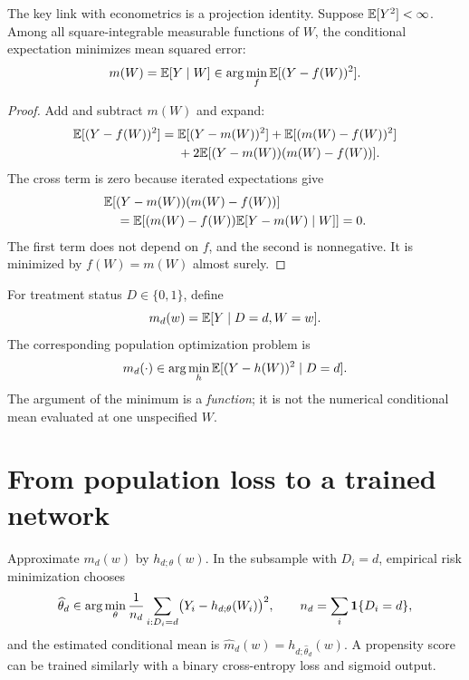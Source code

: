 The key link with econometrics is a projection identity.  Suppose
$\mathbb{E}[Y^2]<\infty$.  Among all square-integrable measurable functions of $W$,
the conditional expectation minimizes mean squared error:
\begin{equation}
  m(W)=\mathbb{E}[Y\mid W]
  \in\arg\min_f\mathbb{E}[(Y-f(W))^2].
  \label{eq:nn-projection}
\end{equation}

\begin{proof}
Add and subtract $m(W)$ and expand:
\begin{align*}
  \mathbb{E}[(Y-f(W))^2]
  ={}&\mathbb{E}[(Y-m(W))^2]+\mathbb{E}[(m(W)-f(W))^2]\\
     &+2\mathbb{E}[(Y-m(W))(m(W)-f(W))].
\end{align*}
The cross term is zero because iterated expectations give
\begin{align*}
  &\mathbb{E}[(Y-m(W))(m(W)-f(W))]\\
  &\quad=\mathbb{E}\!\left[(m(W)-f(W))
        \mathbb{E}[Y-m(W)\mid W]\right]=0.
\end{align*}
The first term does not depend on $f$, and the second is nonnegative.  It is
minimized by $f(W)=m(W)$ almost surely.
\end{proof}

For treatment status $D\in\{0,1\}$, define
\begin{equation}
  m_d(w)=\mathbb{E}[Y\mid D=d,W=w].
  \label{eq:nn-treatment-regression}
\end{equation}
The corresponding population optimization problem is
\begin{equation}
  m_d(\cdot)\in
  \arg\min_h\mathbb{E}[(Y-h(W))^2\mid D=d].
  \label{eq:nn-population-loss}
\end{equation}
The argument of the minimum is a \emph{function}; it is not the numerical
conditional mean evaluated at one unspecified $W$.

\section{From population loss to a trained network}

Approximate $m_d(w)$ by $h_{d;\theta}(w)$.  In the subsample with $D_i=d$,
empirical risk minimization chooses
\begin{equation}
  \widehat\theta_d\in
  \arg\min_\theta
  \frac{1}{n_d}\sum_{i:D_i=d}
  \bigl(Y_i-h_{d;\theta}(W_i)\bigr)^2,
  \qquad n_d=\sum_i\mathbf{1}\{D_i=d\},
  \label{eq:nn-erm}
\end{equation}
and the estimated conditional mean is
$\widehat m_d(w)=h_{d;\widehat\theta_d}(w)$.  A propensity score can be trained
similarly with a binary cross-entropy loss and sigmoid output.


